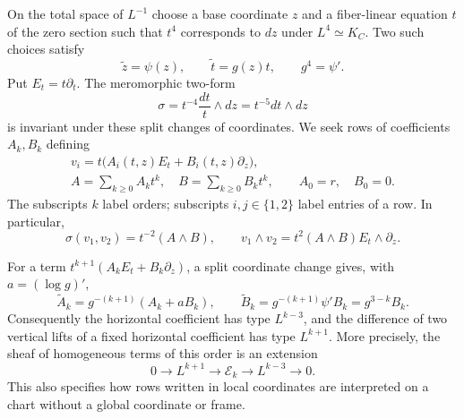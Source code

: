 On the total space of $L^{-1}$ choose a base coordinate $z$ and a
fiber-linear equation $t$ of the zero section such that $t^4$ corresponds
to $dz$ under $L^4\simeq K_C$.  Two such choices satisfy
\[
 \widetilde z=\psi(z),\qquad \widetilde t=g(z)t,
 \qquad g^4=\psi'.
\]
Put $E_t=t\partial_t$.  The meromorphic two-form
\begin{equation}\label{jets:volume}
 \sigma=t^{-4}\frac{dt}{t}\wedge dz=t^{-5}dt\wedge dz
\end{equation}
is invariant under these split changes of coordinates.
We seek rows of coefficients $A_k,B_k$ defining
\begin{equation}\label{jets:fields}
 \begin{gathered}
 v_i=t\bigl(A_i(t,z)E_t+B_i(t,z)\partial_z\bigr),\\
 A=\sum_{k\geq0}A_kt^k,\quad B=\sum_{k\geq0}B_kt^k,
 \qquad A_0=r,\quad B_0=0.
 \end{gathered}
\end{equation}
The subscripts $k$ label orders; subscripts $i,j\in\{1,2\}$ label
entries of a row.  In particular,
\begin{equation}\label{jets:determinant}
 \sigma(v_1,v_2)=t^{-2}(A\wedge B),\qquad
 v_1\wedge v_2=t^2(A\wedge B)E_t\wedge\partial_z.
\end{equation}

For a term $t^{k+1}(A_kE_t+B_k\partial_z)$, a split coordinate change
gives, with $a=(\log g)'$,
\begin{equation}\label{jets:split-coefficients}
 \widetilde A_k=g^{-(k+1)}(A_k+aB_k),\qquad
 \widetilde B_k=g^{-(k+1)}\psi' B_k=g^{3-k}B_k.
\end{equation}
Consequently the horizontal coefficient has type $L^{k-3}$, and the
difference of two vertical lifts of a fixed horizontal coefficient has
type $L^{k+1}$.  More precisely, the sheaf of homogeneous terms of this
order is an extension
\begin{equation}\label{jets:homogeneous-extension}
 0\longrightarrow L^{k+1}\longrightarrow\mathcal E_k
 \longrightarrow L^{k-3}\longrightarrow0.
\end{equation}
This also specifies how rows written in local coordinates are interpreted
on a chart without a global coordinate or frame.

